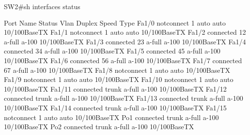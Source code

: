 \documentclass[10pt]{article}
\begin{document}
\begin{itemize}
\begin{verbatim*}
SW2#sh interfaces status

Port    Name               Status       Vlan       Duplex Speed Type
Fa1/0                      notconnect   1            auto    auto 10/100BaseTX
Fa1/1                      notconnect   1            auto    auto 10/100BaseTX
Fa1/2                      connected    12         a-full   a-100 10/100BaseTX
Fa1/3                      connected    23         a-full   a-100 10/100BaseTX
Fa1/4                      connected    34         a-full   a-100 10/100BaseTX
Fa1/5                      connected    45         a-full   a-100 10/100BaseTX
Fa1/6                      connected    56         a-full   a-100 10/100BaseTX
Fa1/7                      connected    67         a-full   a-100 10/100BaseTX
Fa1/8                      notconnect   1            auto    auto 10/100BaseTX
Fa1/9                      notconnect   1            auto    auto 10/100BaseTX
Fa1/10                     notconnect   1            auto    auto 10/100BaseTX
Fa1/11                     connected    trunk      a-full   a-100 10/100BaseTX
Fa1/12                     connected    trunk      a-full   a-100 10/100BaseTX
Fa1/13                     connected    trunk      a-full   a-100 10/100BaseTX
Fa1/14                     connected    trunk      a-full   a-100 10/100BaseTX
Fa1/15                     notconnect   1            auto    auto 10/100BaseTX
Po1                        connected    trunk      a-full   a-100 10/100BaseTX
Po2                        connected    trunk      a-full   a-100 10/100BaseTX
\end{verbatim*}
\end{itemize}
\end{document}
